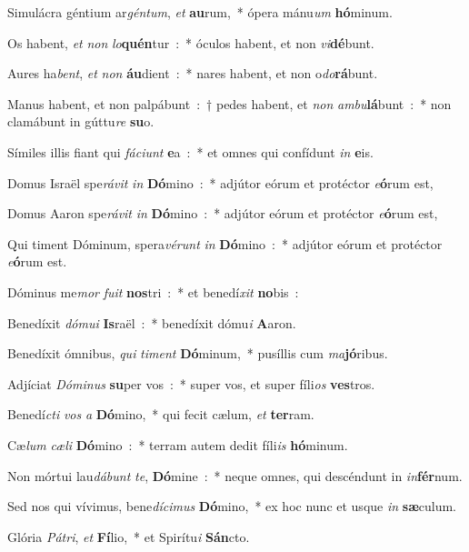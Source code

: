 \documentclass[letterpaper,12pt]{article} %
\begin{document}
\begin{parcolumns}[colwidths={1=262pt},rulebetween]{2}
{\begin{psalmverses}[1]
\item Simulácra géntium ar\emph{gén}\emph{tum}, \emph{et} \textbf{au}rum,~* ópera mánu\emph{um} \textbf{hó}minum.
\item Os habent, \emph{et} \emph{non} \emph{lo}\textbf{quén}tur~:~* óculos habent, et non \emph{vi}\textbf{dé}bunt.
\item Aures ha\emph{bent}, \emph{et} \emph{non} \textbf{áu}dient~:~* nares habent, et non o\emph{do}\textbf{rá}bunt.
\item Manus habent, et non palpábunt~:~† pedes habent, et \emph{non} \emph{am}\emph{bu}\textbf{lá}bunt~:~* non clamábunt in gúttu\emph{re} \textbf{su}o.
\item Símiles illis fiant qui \emph{fá}\emph{ci}\emph{unt} \textbf{e}a~:~* et omnes qui confídunt \emph{in} \textbf{e}is.
\item Domus Israël spe\emph{rá}\emph{vit} \emph{in} \textbf{Dó}mino~:~* adjútor eórum et protéctor \emph{e}\textbf{ó}rum est,
\item Domus Aaron spe\emph{rá}\emph{vit} \emph{in} \textbf{Dó}mino~:~* adjútor eórum et protéctor \emph{e}\textbf{ó}rum est,
\item Qui timent Dóminum, spera\emph{vé}\emph{runt} \emph{in} \textbf{Dó}mino~:~* adjútor eórum et protéctor \emph{e}\textbf{ó}rum est.
\item Dóminus me\emph{mor} \emph{fu}\emph{it} \textbf{nos}tri~:~* et benedí\emph{xit} \textbf{no}bis~:
\item Benedíxit \emph{dó}\emph{mu}\emph{i} \textbf{Is}raël~:~* benedíxit dómu\emph{i} \textbf{A}aron.
\item Benedíxit ómnibus, \emph{qui} \emph{ti}\emph{ment} \textbf{Dó}minum,~* pusíllis cum \emph{ma}\textbf{jó}ribus.
\item Adjíciat \emph{Dó}\emph{mi}\emph{nus} \textbf{su}per vos~:~* super vos, et super fíli\emph{os} \textbf{ves}tros.
\item Benedí\emph{cti} \emph{vos} \emph{a} \textbf{Dó}mino,~* qui fecit cælum, \emph{et} \textbf{ter}ram.
\item Cæ\emph{lum} \emph{cæ}\emph{li} \textbf{Dó}mino~:~* terram autem dedit fíli\emph{is} \textbf{hó}\-mi\-num.
\item Non mórtui lau\emph{dá}\emph{bunt} \emph{te}, \textbf{Dó}mine~:~* neque omnes, qui descéndunt in \emph{in}\textbf{fér}num.
\item Sed nos qui vívimus, bene\emph{dí}\emph{ci}\emph{mus} \textbf{Dó}mino,~* ex hoc nunc et usque \emph{in} \textbf{sæ}culum.
\item Glória \emph{Pá}\emph{tri}, \emph{et} \textbf{Fí}lio,~* et Spirítu\emph{i} \textbf{Sán}cto.

\end{psalmverses}}
\end{parcolumns}
\end{document}

